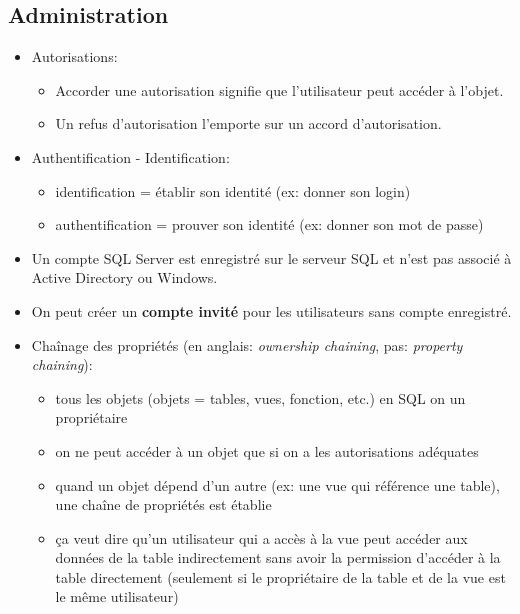 \documentclass[a4paper]{article}
\begin{document}
\subsection{Administration}





\begin{itemize}



\item Autorisations:
\begin{itemize}
    \item Accorder une autorisation signifie que l’utilisateur peut accéder à l’objet.
    \item Un refus d’autorisation l’emporte sur un accord d’autorisation. 
\end{itemize}



\item Authentification - Identification:
\begin{itemize}
    \item identification = établir son identité (ex: donner son login)
    \item authentification = prouver son identité (ex: donner son mot de passe)
\end{itemize}



\item Un compte SQL Server est enregistré sur le serveur SQL et n'est pas associé à Active Directory ou Windows.



\item On peut créer un \textbf{compte invité} pour les utilisateurs sans compte enregistré.



\item Chaînage des propriétés (en anglais: \textit{ownership chaining}, pas: \textit{property chaining}):
\begin{itemize}
    \item tous les objets (objets = tables, vues, fonction, etc.) en SQL on un propriétaire
    \item on ne peut accéder à un objet que si on a les autorisations adéquates
    \item quand un objet dépend d'un autre (ex: une vue qui référence une table), une chaîne de propriétés est établie
    \item ça veut dire qu'un utilisateur qui a accès à la vue peut accéder aux données de la table indirectement sans avoir la permission d'accéder à la table directement (seulement si le propriétaire de la table et de la vue est le même utilisateur)
\end{itemize}
\begin{center}
    \begin{tikzpicture}


\end{tikzpicture}
\end{center}
\end{itemize}
\end{document}

